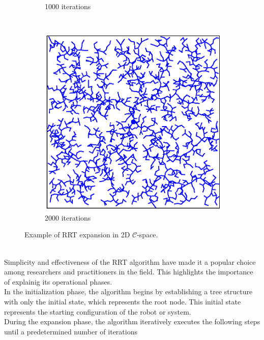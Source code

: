 \documentclass{ctuthesis}
\begin{document}
\begin{figure}[!ht]
\begin{subfigure}[b]{0.3\textwidth}
      \caption{1000 iterations}
  \end{subfigure}
  ~ %
  \begin{subfigure}[b]{0.3\textwidth}
      \includegraphics[width=\textwidth]{figChap3/2RRTexpansion2000.eps}
      \caption{2000 iterations}
  \end{subfigure}
  \caption{Example of RRT expansion in 2D $\mathcal{C}$-space.}
  \label{fig:RRTgrowing}
\end{figure} 
\\
Simplicity and effectiveness of the RRT algorithm have made it a popular choice among researchers and practitioners in the field.
This highlights the importance of explainig its operational phases.\\[12pt]
In the initialization phase, 
the algorithm begins by establishing a tree structure with only the initial state, 
which represents the root node. 
This initial state represents the starting configuration of the robot or system.\\[12pt]
During the expansion phase, 
the algorithm iteratively executes the following steps until a predetermined number of iterations 
\end{document}
